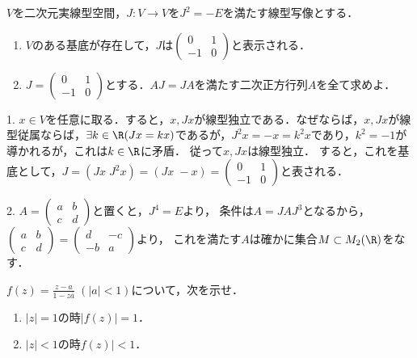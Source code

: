 \documentclass[uplatex, dvipdfmx]{jsreport}
\begin{document}
\begin{problem}\label{problem-complex-linear-mappings}
    $V$を二次元実線型空間，$J:V\to V$を$J^2=-E$を満たす線型写像とする．
    \begin{enumerate}
        \item $V$のある基底が存在して，$J$は$\begin{pmatrix}0&1\\-1&0\end{pmatrix}$と表示される．
        \item $J=\begin{pmatrix}0&1\\-1&0\end{pmatrix}$とする．$AJ=JA$を満たす二次正方行列$A$を全て求めよ．
    \end{enumerate}
\end{problem}
\begin{solution*}
    1. $x\in V$を任意に取る．すると，$x,Jx$が線型独立である．なぜならば，$x,Jx$が線型従属ならば，$\exists k\in\R(Jx=kx)$であるが，$J^2x=-x=k^2x$であり，$k^2=-1$が導かれるが，これは$k\in\R$に矛盾．
    従って$x,Jx$は線型独立．
    すると，これを基底として，$J=(Jx\;J^2x)=(Jx\;-x)=\begin{pmatrix}0&1\\-1&0\end{pmatrix}$と表される．

    2. $A=\begin{pmatrix}a&b\\c&d\end{pmatrix}$と置くと，$J^4=E$より，
    条件は$A=JAJ^3$となるから，$\begin{pmatrix}a&b\\c&d\end{pmatrix}=\begin{pmatrix}d&-c\\-b&a\end{pmatrix}$より，
    これを満たす$A$は確かに集合$M\subset M_2(\R)$をなす．
\end{solution*}

\begin{problem}
    $f(z)=\frac{z-a}{1-z\overline{a}}\;(|a|<1)$について，次を示せ．
    \begin{enumerate}
        \item $|z|=1$の時$|f(z)|=1$．
        \item $|z|<1$の時$f(z)|<1$．
    \end{enumerate}
\end{problem}
\end{document}
